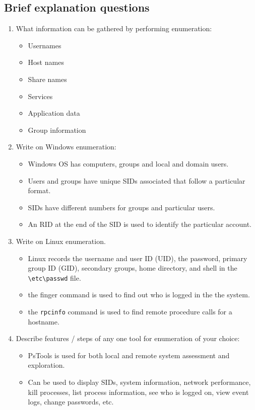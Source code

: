 \subsection{Brief explanation questions}
\begin{enumerate}
    \item What information can be gathered by performing enumeration:
    \begin{itemize}
        \item Usernames
        \item Host names
        \item Share names
        \item Services
        \item Application data
        \item Group information
    \end{itemize}
    \item Write on Windows enumeration:
    \begin{itemize}
        \item Windows OS has computers, groups and local and domain users.
        \item Users and groups have unique SIDs associated that follow a particular format.
        \item SIDs have different numbers for groups and particular users.
        \item An RID at the end of the SID is used to identify the particular account.
    \end{itemize}
    \item Write on Linux enumeration.
    \begin{itemize}
        \item Linux records the username and user ID (UID), the password, primary group ID (GID), secondary groups, home directory, and shell in the \verb|\etc\passwd| file.
        \item the finger command is used to find out who is logged in the the system.
        \item the \verb|rpcinfo| command is used to find remote procedure calls for a hostname.
    \end{itemize}
    \item Describe features / steps of any one tool for enumeration of your choice:
    \begin{itemize}
        \item PsTools is used for both local and remote system assessment and exploration.
        \item Can be used to display SIDs, system information, network performance, kill processes, list process information, see who is logged on, view event logs, change passwords, etc.

\end{itemize}
\end{enumerate}
